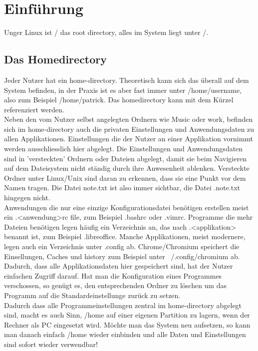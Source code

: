 \section{Einf\"uhrung}
Unger Linux ist / das root directory, alles im System liegt unter /.\\
\subsection{Das Homedirectory}
Jeder Nutzer hat ein home-directory. Theoretisch kann sich das \"uberall auf dem System befinden, in der Praxis ist es aber fast immer unter /home/username, also zum Beispiel /home/patrick. Das homedirectory kann mit dem K\"urzel ~ referenziert werden.\\
Neben den vom Nutzer selbst angelegten Ordnern wie Music oder work, befinden sich im home-directory auch die privaten Einstellungen und Anwendungsdaten zu allen Applikationen. Einstellungen die der Nutzer an einer Applikation vornimmt werden ausschliesslich hier abgelegt. Die Einstellungen und Anwendungsdaten sind in 'versteckten' Ordnern oder Dateien abgelegt, damit sie beim Navigieren auf dem Dateisystem nicht st\"andig durch ihre Anwesenheit ablenken. Versteckte Ordner unter Linux/Unix sind daran zu erkennen, dass sie eine Punkt vor dem Namen tragen. Die Datei note.txt ist also immer sichtbar, die Datei .note.txt hingegen nicht.\\
Anwendungen die nur eine einzige Konfigurationsdatei ben\"otigen erstellen meist ein .<anwendung>rc file, zum Beispiel .bashrc oder .vimrc. Programme die mehr Dateien ben\"otigen legen h\"aufig ein Verzeichnis an, das nach .<applikation> benannt ist, zum Beispiel .libreoffice. Manche Applikationen, meist modernere, legen auch ein Verzeichnis unter .config ab. Chrome/Chromium speichert die Einsellungen, Caches und history zum Beispiel unter ~/.config/chromium ab.\\
Dadurch, dass alle Applikationsdaten hier gespeichert sind, hat der Nutzer einfachen Zugriff darauf. Hat man die Konfiguration eines Programmes verschossen, so gen\"ugt es, den entsprechenden Ordner zu l\"oschen um das Programm auf die Standardeinstellunge zur\"uck zu setzen.\\
Dadurch dass alle Programmeinstellungen zentral im home-directory abgelegt sind, macht es auch Sinn, /home auf einer eigenen Partition zu lagern, wenn der Rechner als PC eingesetzt wird. M\"ochte man das System neu aufsetzen, so kann man danach einfach /home wieder einbinden und alle Daten und Einstellungen sind sofort wieder verwendbar!
